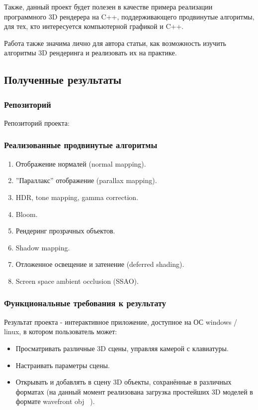 \documentclass[14pt]{extarticle}
\begin{document}
Также, данный проект будет полезен в качестве примера реализации программного 3D рендерера на C++, поддерживающего продвинутые алгоритмы, для тех, кто интересуется компьютерной графикой и C++.

Работа также значима лично для автора статьи, как возможность изучить алгоритмы 3D рендеринга и реализовать их на практике.

\subsection{Полученные результаты}
\subsubsection {Репозиторий}
Репозиторий проекта: ~\cite{3dRenderer}

\subsubsection{Реализованные продвинутые алгоритмы}
\begin{enumerate}
	\item Отображение нормалей (normal mapping).
	\item ''Параллакс'' отображение (parallax mapping).
	\item HDR, tone mapping, gamma correction.
	\item Bloom.
	\item Рендеринг прозрачных объектов.
	\item Shadow mapping.
	\item Отложенное освещение и затенение (deferred shading).
	\item Screen space ambient occlusion (SSAO).
\end{enumerate}

\subsubsection{Функциональные требования к результату}
Результат проекта - интерактивное приложение, доступное на ОС windows / linux, в котором пользователь может:
\begin{itemize}
	\item Просматривать различные 3D сцены, управляя камерой с клавиатуры.
	\item Настраивать параметры сцены.
	\item Открывать и добавлять в сцену 3D объекты, сохранённые в различных форматах (на данный момент реализована загрузка простейших 3D моделей в формате wavefront obj ~\cite{obj}).
\end{itemize}
\end{document}
